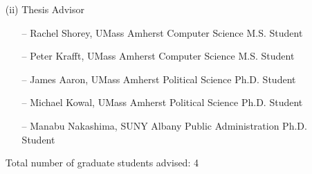 \begin{enumerate}
\begin{enumerate}
\item[(ii)] Thesis Advisor
\begin{enumerate}
\item[--] Rachel Shorey, UMass Amherst Computer Science M.S. Student
\item[--] Peter Krafft, UMass Amherst Computer Science M.S. Student
\item[--] James Aaron, UMass Amherst Political Science Ph.D. Student
\item[--] Michael Kowal, UMass Amherst Political Science Ph.D. Student
\item[--] Manabu Nakashima, SUNY Albany Public Administration Ph.D. Student
\end{enumerate}
Total number of graduate students advised: 4

\end{enumerate}
\end{enumerate}

